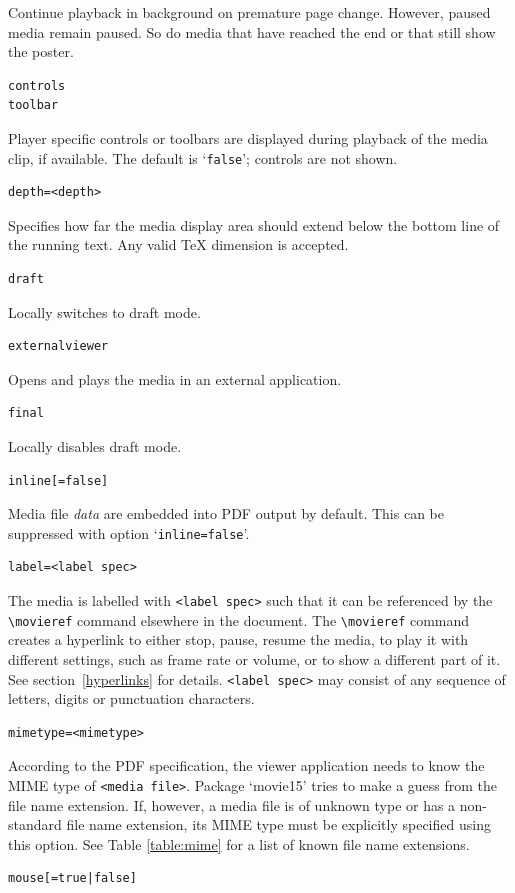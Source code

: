 \documentclass[a4paper]{article}
\begin{document}
Continue playback in background on premature page change. However, paused media remain paused. So do media that have reached the end or that still show the poster.
\begin{verbatim}
controls
toolbar
\end{verbatim}
Player specific controls or toolbars are displayed during playback of the media clip, if available. The default is `\verb+false+'; controls are not shown.
\begin{verbatim}
depth=<depth>
\end{verbatim}
Specifies how far the media display area should extend below the bottom line of the running text. Any valid \TeX{} dimension is accepted.
\begin{verbatim}
draft
\end{verbatim}
Locally switches to draft mode.
\begin{verbatim}
externalviewer
\end{verbatim}
Opens and plays the media in an external application.
\begin{verbatim}
final
\end{verbatim}
Locally disables draft mode.
\begin{verbatim}
inline[=false]
\end{verbatim}
Media file \emph{data} are embedded into PDF output by default.
This can be suppressed with option `\verb+inline=false+'.
\begin{verbatim}
label=<label spec>
\end{verbatim}
The media is labelled with \verb+<label spec>+ such that it can be referenced by the \verb+\movieref+ command elsewhere in the document. The \verb+\movieref+ command creates a hyperlink to either stop, pause, resume the media, to play it with different settings, such as frame rate or volume, or to show a different part of it. See section~\ref{hyperlinks} for details. \verb+<label spec>+ may consist of any sequence of letters, digits or punctuation characters.
\begin{verbatim}
mimetype=<mimetype>
\end{verbatim}
According to the PDF specification, the viewer application needs to know the MIME type of \verb+<media file>+. Package `movie15' tries to make a guess from the file name extension. If, however, a media file is of unknown type or has a non-standard file name extension, its MIME type must be explicitly specified using this option. See Table \ref{table:mime} for a list of known file name extensions.
\begin{verbatim}
mouse[=true|false]
\end{verbatim}
\end{document}
